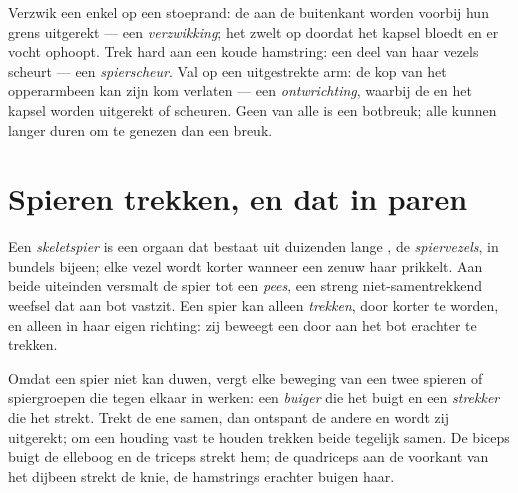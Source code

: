 \begin{example}\label{ex:g10:muscles-and-joints:injuries}
Verzwik een enkel op een stoeprand: de  aan de buitenkant
worden voorbij hun grens uitgerekt --- een \emph{verzwikking}; het
 zwelt op doordat het kapsel bloedt en er vocht ophoopt. Trek
hard aan een koude hamstring: een deel van haar vezels scheurt --- een
\emph{spierscheur}. Val op een uitgestrekte arm: de kop van het
opperarmbeen kan zijn kom verlaten --- een \emph{ontwrichting}, waarbij
de  en het kapsel worden uitgerekt of scheuren. Geen van
alle is een botbreuk; alle kunnen langer duren om te genezen dan een
breuk.
\end{example}

\section{Spieren trekken, en dat in paren}

\begin{definition}\label{def:g10:muscles-and-joints:muscle}
Een \emph{skeletspier} is een orgaan dat bestaat uit
duizenden lange , de \emph{spiervezels}, in bundels bijeen; elke
vezel wordt korter wanneer een zenuw haar prikkelt. Aan beide uiteinden
versmalt de spier tot een \emph{pees}, een streng
niet-samentrekkend weefsel dat aan bot vastzit. Een spier kan alleen
\emph{trekken}, door korter te worden, en alleen in haar eigen richting:
zij beweegt een  door aan het bot erachter te trekken.
\end{definition}

\begin{proposition}\label{prop:g10:muscles-and-joints:antagonists}
Omdat een spier niet kan duwen, vergt elke beweging van een  twee
spieren of spiergroepen die tegen elkaar in werken: een \emph{buiger} die
het  buigt en een \emph{strekker} die het strekt. Trekt de ene
samen, dan ontspant de andere en wordt zij uitgerekt; om een houding vast
te houden trekken beide tegelijk samen. De biceps buigt de elleboog en de
triceps strekt hem; de quadriceps aan de voorkant van het dijbeen strekt
de knie, de hamstrings erachter buigen haar.
\end{proposition}
\admitted

